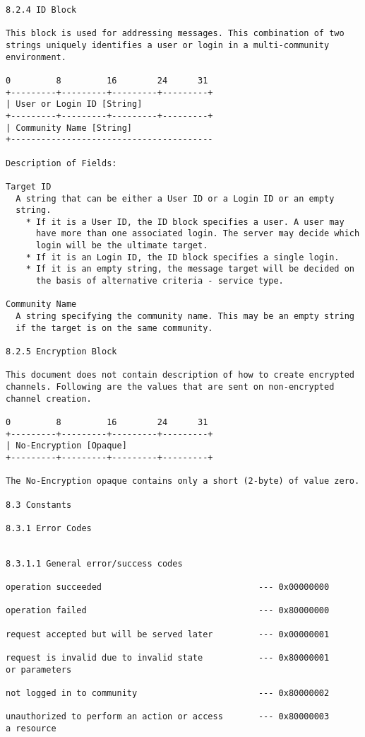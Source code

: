 \documentclass[titlepage,oneside]{book}
\begin{document}
\begin{verbatim}
8.2.4 ID Block

This block is used for addressing messages. This combination of two
strings uniquely identifies a user or login in a multi-community
environment.

0         8         16        24      31
+---------+---------+---------+---------+
| User or Login ID [String]
+---------+---------+---------+---------+
| Community Name [String]
+----------------------------------------

Description of Fields:

Target ID
  A string that can be either a User ID or a Login ID or an empty
  string.
    * If it is a User ID, the ID block specifies a user. A user may
      have more than one associated login. The server may decide which
      login will be the ultimate target.
    * If it is an Login ID, the ID block specifies a single login.
    * If it is an empty string, the message target will be decided on
      the basis of alternative criteria - service type.

Community Name
  A string specifying the community name. This may be an empty string
  if the target is on the same community.

8.2.5 Encryption Block

This document does not contain description of how to create encrypted
channels. Following are the values that are sent on non-encrypted
channel creation.

0         8         16        24      31
+---------+---------+---------+---------+
| No-Encryption [Opaque]
+---------+---------+---------+---------+

The No-Encryption opaque contains only a short (2-byte) of value zero.

8.3 Constants

8.3.1 Error Codes


8.3.1.1 General error/success codes

operation succeeded                               --- 0x00000000

operation failed                                  --- 0x80000000

request accepted but will be served later         --- 0x00000001

request is invalid due to invalid state           --- 0x80000001
or parameters

not logged in to community                        --- 0x80000002

unauthorized to perform an action or access       --- 0x80000003
a resource


\end{verbatim}
\end{document}
